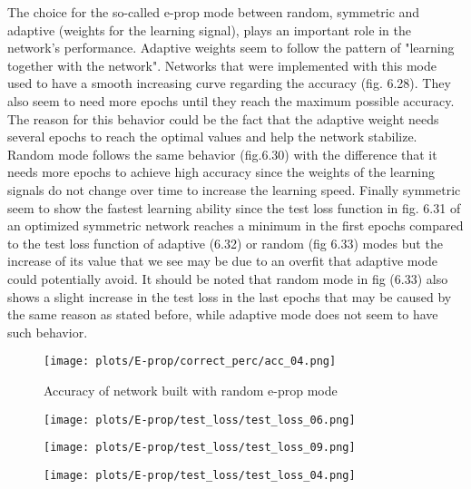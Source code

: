 \documentclass[12pt]{report}
\begin{document}
The choice for the so-called e-prop mode between random, symmetric and adaptive (weights for the learning signal), plays an important role in the network's performance. Adaptive weights seem to follow the pattern of "learning together with the network". Networks that were implemented with this mode used to have a smooth increasing curve regarding the accuracy (fig. 6.28). They also seem to need more epochs until they reach the maximum possible accuracy. The reason for this behavior could be the fact that the adaptive weight needs several epochs to reach the optimal values and help the network stabilize. Random mode follows the same behavior (fig.6.30) with the difference that it needs more epochs to achieve high accuracy since the weights of the learning signals do not change over time to increase the learning speed. Finally symmetric seem to show the fastest learning ability since the test loss function in fig. 6.31 of an optimized symmetric network reaches a minimum in the first epochs compared to the test loss function of adaptive (6.32) or random (fig 6.33) modes but the increase of its value that we see may be due to an overfit that adaptive mode could potentially avoid. It should be noted that random mode in fig (6.33) also shows a slight increase in the test loss in the last epochs that may be caused by the same reason as stated before, while adaptive mode does not seem to have such behavior.

\begin{figure}[htp] %
    \centering
     \texttt{[image: plots/E-prop/correct\_perc/acc\_04.png]}
    \caption{Accuracy of network built with random e-prop mode}
    \label{fig:representation-methods}
\end{figure}

\begin{figure}
\centering
\begin{minipage}{.4\textwidth}
  \centering
  \texttt{[image: plots/E-prop/test\_loss/test\_loss\_06.png]}
  \label{fig:test1}
\end{minipage}
\begin{minipage}{.4\textwidth}
  \centering
  \texttt{[image: plots/E-prop/test\_loss/test\_loss\_09.png]}
  \label{fig:test2}
\end{minipage}
\begin{minipage}{.4\textwidth}
  \centering
  \texttt{[image: plots/E-prop/test\_loss/test\_loss\_04.png]}
  \label{fig:test1}
\end{minipage}
\end{figure}
\end{document}
